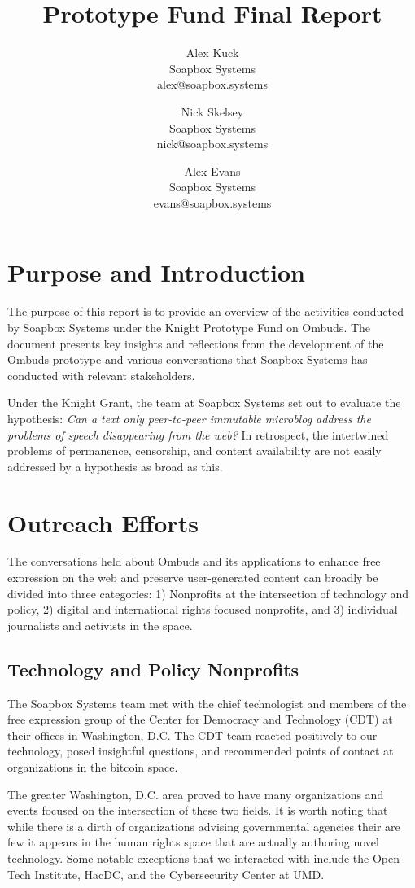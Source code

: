 \documentclass[a4paper]{article}
\title{Prototype Fund Final Report}
\author{
{\rm Alex Kuck}\\
Soapbox Systems\\
alex@soapbox.systems
\and
{\rm Nick Skelsey}\\
Soapbox Systems\\
nick@soapbox.systems
\and
{\rm Alex Evans}\\
Soapbox Systems\\
evans@soapbox.systems
}
\begin{document}
\maketitle

\section{Purpose and Introduction} 

The purpose of this report is to provide an overview of the activities conducted by Soapbox Systems under the Knight Prototype Fund on Ombuds. The document presents key insights and reflections from the development of the Ombuds prototype and various conversations that Soapbox Systems has conducted with relevant stakeholders.\par
Under the Knight Grant, the team at Soapbox Systems set out to evaluate the hypothesis: \textit{Can a text only peer-to-peer immutable microblog address the problems of speech disappearing from the web?} In retrospect, the intertwined problems of permanence, censorship, and content availability are not easily addressed by a hypothesis as broad as this.

\section{Outreach Efforts}
The conversations held about Ombuds and its applications to enhance free expression on the web and preserve user-generated content can broadly be divided into three categories: 1) Nonprofits at the intersection of technology and policy, 2) digital and international rights focused nonprofits, and 3) individual journalists and activists in the space.\par

\subsection{Technology and Policy Nonprofits}
The Soapbox Systems team met with the chief technologist and members of the free expression group of the Center for Democracy and Technology (CDT) at their offices in Washington, D.C. The CDT team reacted positively to our technology, posed insightful questions, and recommended points of contact at organizations in the bitcoin space.\par
The greater Washington, D.C. area proved to have many organizations and events focused on the intersection of these two fields. It is worth noting that while there is a dirth of organizations advising governmental agencies their are few it appears in the human rights space that are actually authoring novel technology. Some notable exceptions that we interacted with include the Open Tech Institute, HacDC, and the Cybersecurity Center at UMD.
\end{document}
